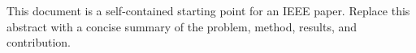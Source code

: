 This document is a self-contained starting point for an IEEE paper. Replace this abstract with a concise summary of the problem, method, results, and contribution.
